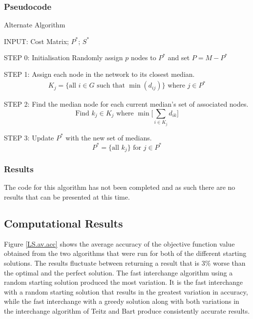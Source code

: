 \documentclass[11pt]{article}
\begin{document}
	\subsubsection{Pseudocode}
	\begin{algorithm}
		\caption{Alternate Algorithm}
		\begin{algorithmic}[0]
			\Statex 
			\Statex INPUT: Cost Matrix; $P^*$; $S^*$
			
			\Statex 
			\Statex STEP 0: Initialisation
			\Statex Randomly assign $p$ nodes to $P^*$ and set $P = M - P^*$
			
			\Statex 
			\Statex STEP 1: Assign each node in the network to its closest median.
			\begin{align*}
			K_j=\{\text{all } i \in G \text{ such that } \min (d_{ij})\} \text{ where } j \in P^*
			\end{align*}
			
			\Statex 
			\Statex STEP 2: Find the median node for each current median's set of associated nodes.
			\begin{equation*}
			\text{Find } k_j \in K_j \text{ where } \min \bigg[ \sum_{i\in K_j} d_{ik} \bigg] 
			\end{equation*}
			
			
			\Statex 
			\Statex STEP 3: Update $P^*$ with the new set of medians.
			\begin{equation*}
			P^{*} = \{\text{all } k_j  \} \text{ for } j \in P^*
			\end{equation*}
			
			
		\end{algorithmic}
	\end{algorithm}

	\subsubsection{Results}
	The code for this algorithm has not been completed and as such there are no results that can be presented at this time.
	
	\subsection{Computational Results} \label{classicheuristics.localsearch.results}
	Figure \ref{LS.av.acc} shows the average accuracy of the objective function value obtained from the two algorithms that were run for both of the different starting solutions.  The results fluctuate between returning a result that is 3\% worse than the optimal and the perfect solution.  The fast interchange algorithm using a random starting solution produced the most variation.  It is the fast interchange with a random starting solution that results in the greatest variation in accuracy, while the fast interchange with a greedy solution along with both variations in the interchange algorithm of Teitz and Bart produce consistently accurate results.
	
\end{document}
